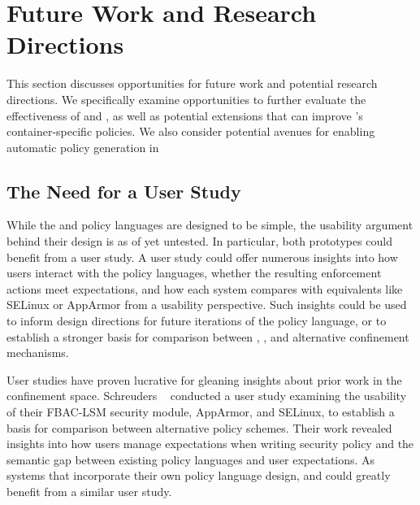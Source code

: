 \section{Future Work and Research Directions}%
\label{s:disc-future-work}

This section discusses opportunities for future work and potential research directions.
We specifically examine opportunities to further evaluate the effectiveness of \bpfbox{}
and \bpfcontain{}, as well as potential extensions that can improve \bpfcontain{}'s
container-specific policies.  We also consider potential avenues for enabling automatic
policy generation in \bpfcontain{}

\subsection{The Need for a User Study}
\label{ss:disc-user-study}

While the \bpfbox{} and \bpfcontain{} policy languages are designed to be simple, the
usability argument behind their design is as of yet untested. In particular, both
prototypes could benefit from a user study. A user study could offer numerous insights
into how users interact with the policy languages, whether the resulting enforcement
actions meet expectations, and how each system compares with equivalents like SELinux or
AppArmor from a usability perspective. Such insights could be used to inform design
directions for future iterations of the policy language, or to establish a stronger basis
for comparison between \bpfbox{}, \bpfcontain{}, and alternative confinement mechanisms.

User studies have proven lucrative for gleaning insights about prior work in the
confinement space. Schreuders \etal~\cite{schreuders2012_towards} conducted a user study
examining the usability of their FBAC-LSM security module, AppArmor, and SELinux, to
establish a basis for comparison between alternative policy schemes. Their work revealed
insights into how users manage expectations when writing security policy and the semantic
gap between existing policy languages and user expectations. As systems that incorporate
their own policy language design, \bpfbox{} and \bpfcontain{} could greatly benefit from
a similar user study.

